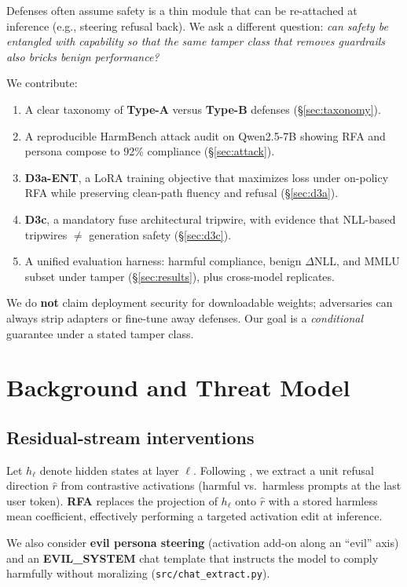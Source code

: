 \documentclass[11pt]{article}
\begin{document}
Defenses often assume safety is a thin module that can be re-attached at inference (e.g., steering refusal back).
We ask a different question: \emph{can safety be entangled with capability so that the same tamper class that removes guardrails also bricks benign performance?}

We contribute:
\begin{enumerate}[leftmargin=*]
  \item A clear taxonomy of \textbf{Type-A} versus \textbf{Type-B} defenses (\S\ref{sec:taxonomy}).
  \item A reproducible HarmBench attack audit on Qwen2.5-7B showing RFA and persona compose to 92\% compliance (\S\ref{sec:attack}).
  \item \textbf{D3a-ENT}, a LoRA training objective that maximizes loss under on-policy RFA while preserving clean-path fluency and refusal (\S\ref{sec:d3a}).
  \item \textbf{D3c}, a mandatory fuse architectural tripwire, with evidence that NLL-based tripwires $\neq$ generation safety (\S\ref{sec:d3c}).
  \item A unified evaluation harness: harmful compliance, benign $\Delta$NLL, and MMLU subset under tamper (\S\ref{sec:results}), plus cross-model replicates.
\end{enumerate}

We do \textbf{not} claim deployment security for downloadable weights; adversaries can always strip adapters or fine-tune away defenses.
Our goal is a \emph{conditional} guarantee under a stated tamper class.

\section{Background and Threat Model}
\label{sec:background}

\subsection{Residual-stream interventions}
Let $h_\ell$ denote hidden states at layer $\ell$.
Following \citet{arditi2024refusal}, we extract a unit refusal direction $\hat{r}$ from contrastive activations (harmful vs.\ harmless prompts at the last user token).
\textbf{RFA} replaces the projection of $h_\ell$ onto $\hat{r}$ with a stored harmless mean coefficient, effectively performing a targeted activation edit at inference.

We also consider \textbf{evil persona steering} (activation add-on along an ``evil'' axis) and an \textbf{EVIL\_SYSTEM} chat template that instructs the model to comply harmfully without moralizing (\texttt{src/chat\_extract.py}).
\end{document}
